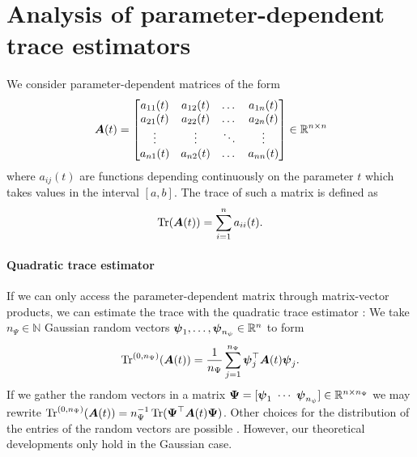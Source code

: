 \documentclass[12pt]{article}
\begin{document}
\section{Analysis of parameter-dependent trace estimators}
\label{sec:analysis}

We consider parameter-dependent matrices of the form
\begin{equation}
    \boldsymbol{A}(t) = \begin{bmatrix}
        a_{11}(t) & a_{12}(t) & \dots & a_{1n}(t) \\
        a_{21}(t) & a_{22}(t) & \dots & a_{2n}(t) \\
        \vdots & \vdots & \ddots & \vdots \\
        a_{n1}(t) & a_{n2}(t) & \dots & a_{nn}(t) \\
    \end{bmatrix} \in \mathbb{R}^{n \times n}
\end{equation}
where $a_{ij}(t)$ are functions depending continuously on the parameter $t$ which takes values in the interval $[a,b]$. The trace of such a matrix is defined as
\begin{equation}
    \operatorname{Tr}(\boldsymbol{A}(t)) = \sum_{i=1}^{n} a_{ii}(t).
\end{equation}

\paragraph{Quadratic trace estimator} If we can only access the parameter-dependent matrix through matrix-vector products, we can estimate the trace with the quadratic trace estimator \cite{}: We take $n_{\Psi} \in \mathbb{N}$ Gaussian random vectors $\boldsymbol{\psi}_1,\dots, \boldsymbol{\psi}_{n_{\psi}} \in \mathbb{R}^{n}$ to form
\begin{equation}
    \operatorname{Tr}^{(0, n_{\Psi})}(\boldsymbol{A}(t)) = \frac{1}{n_{\Psi}} \sum_{j=1}^{n_{\Psi}} \boldsymbol{\psi}_j^{\top} \boldsymbol{A}(t) \boldsymbol{\psi}_j.
    \label{equ:quadratic-trace-estimator}
\end{equation}
If we gather the random vectors in a matrix $\boldsymbol{\Psi} = [\boldsymbol{\psi}_1 ~ \cdots ~ \boldsymbol{\psi}_{n_{\psi}}] \in \mathbb{R}^{n \times n_{\Psi}}$ we may rewrite $\operatorname{Tr}^{(0, n_{\Psi})}(\boldsymbol{A}(t)) = n_{\Psi}^{-1} \operatorname{Tr}( \boldsymbol{\Psi}^{\top} \boldsymbol{A}(t) \boldsymbol{\Psi})$. Other choices for the distribution of the entries of the random vectors are possible \cite{}. However, our theoretical developments only hold in the Gaussian case.
\end{document}
